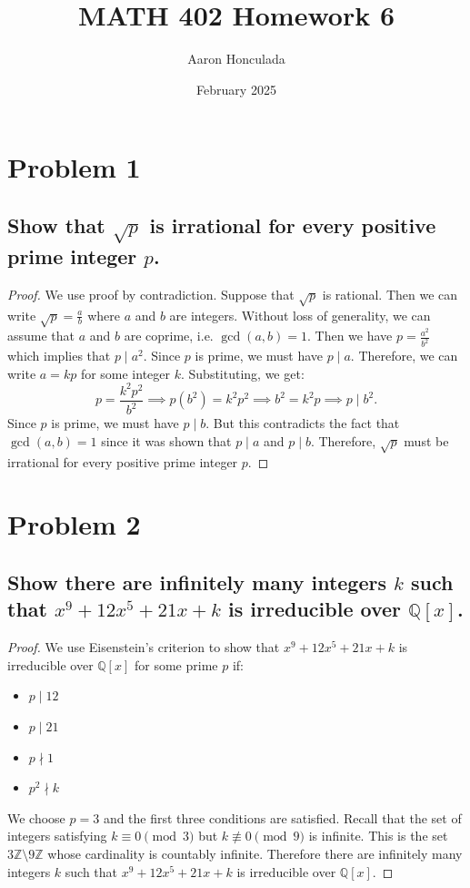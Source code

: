 \documentclass{article}
\title{MATH 402 Homework 6}
\author{Aaron Honculada}
\date{February 2025}
\begin{document}
\maketitle

\section{Problem 1}
\subsection{Show that $\sqrt{p}$ is irrational for every positive prime integer $p$.}

\begin{proof}
    We use proof by contradiction. Suppose that $\sqrt{p}$ is rational. Then we can write $\sqrt{p} = \frac{a}{b}$ where $a$ and $b$ are integers.
    Without loss of generality, we can assume that $a$ and $b$ are coprime, i.e. $\gcd(a,b) = 1$. Then we have $p = \frac{a^2}{b^2}$ which implies that $p \mid a^2$. Since $p$ is prime,
    we must have $p \mid a$. Therefore, we can write $a = kp$ for some integer $k$. Substituting, we get:
    \[
        p = \frac{k^2p^2}{b^2} \implies p(b^2) = k^2p^2 \implies b^2 = k^2p \implies p \mid b^2.
    \]
    Since $p$ is prime, we must have $p \mid b$. But this contradicts the fact that $\gcd(a,b) = 1$ since it was shown that $p \mid a$ and $p \mid b$. Therefore, $\sqrt{p}$ must be irrational
    for every positive prime integer $p$.
\end{proof}

\section{Problem 2}
\subsection{Show there are infinitely many integers $k$ such that $x^9 + 12x^5 + 21x + k$ is irreducible over $\mathbb{Q}[x]$.}

\begin{proof}
    We use Eisenstein's criterion to show that $x^9 + 12x^5 + 21x + k$ is irreducible over $\mathbb{Q}[x]$ for some prime $p$ if:
    \begin{itemize}
        \item $p \mid 12$
        \item $p \mid 21$
        \item $p \nmid 1$
        \item $p^2 \nmid k$
    \end{itemize}
    We choose $p=3$ and the first three conditions are satisfied. Recall that the set of integers satisfying $k \equiv 0 \pmod{3}$ but 
    $k \not\equiv 0 \pmod{9}$ is infinite. This is the set $3\mathbb{Z} \setminus 9\mathbb{Z}$ whose cardinality is countably infinite. Therefore
    there are infinitely many integers $k$ such that $x^9 + 12x^5 + 21x + k$ is irreducible over $\mathbb{Q}[x]$.
\end{proof}
\end{document}
